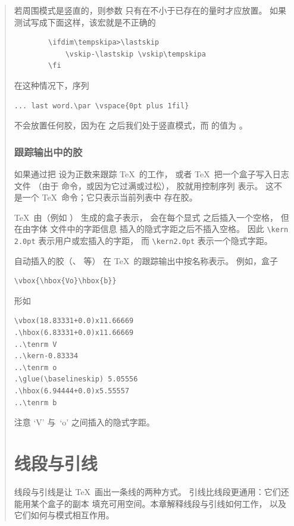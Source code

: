 \documentclass[a4paper]{rapport3}
\def\alt{}\def\altt{}%
\newenvironment{disp}{\begin{quotation}}{\end{quotation}}
\begin{document}
\begin{disp}
若周围模式是竖直的，则参数
只有在不小于已存在的量时才应放置。
如果测试写成下面这样，该宏就是不正确的
\begin{verbatim}
        \ifdim\tempskipa>\lastskip 
            \vskip-\lastskip \vskip\tempskipa
        \fi
\end{verbatim}
在这种情况下，序列
\begin{verbatim}
... last word.\par \vspace{0pt plus 1fil}
\end{verbatim}
不会放置任何胶，因为在
 之后我们处于竖直模式，而
 的值为 \n{0pt}。

\subsection{跟踪输出中的胶}

如果通过把  设为正数来跟踪 \TeX\ 的工作，
或者 \TeX\ 把一个盒子写入日志文件
（由于  命令，或因为它过满或过松），
胶就用控制序列  表示。
这不是一个 \TeX\ 命令；它只表示当前列表中
存在胶。

\TeX\ 由（\alt 例如 ）
生成的盒子表示，
会在每个显式  之后插入一个空格，
但在由字体  文件中的字距信息
插入的隐式字距之后不插入空格。
因此 \hbox{\verb-\kern 2.0pt-} 表示用户或宏插入的字距，
而 \verb-\kern2.0pt- 表示一个隐式字距。

自动插入的胶（、 等）
在 \TeX\ 的跟踪输出中按名称表示。
例如，盒子
\begin{verbatim}
\vbox{\hbox{Vo}\hbox{b}}
\end{verbatim}
形如
\begin{verbatim}
\vbox(18.83331+0.0)x11.66669
.\hbox(6.83331+0.0)x11.66669
..\tenrm V
..\kern-0.83334
..\tenrm o
.\glue(\baselineskip) 5.05556
.\hbox(6.94444+0.0)x5.55557
..\tenrm b
\end{verbatim}
注意 `V' 与~`o' 之间插入的隐式字距。


\endofchapter
\chapter{线段与引线}\label{rules}

线段与引线是让 \TeX\ 画出一条线的两种方式。
引线比线段更通用：它们还能用某个盒子的副本
填充可用空间。本章解释线段与引线如何工作，
以及它们如何与模式相互作用。



\end{disp}
\end{document}
